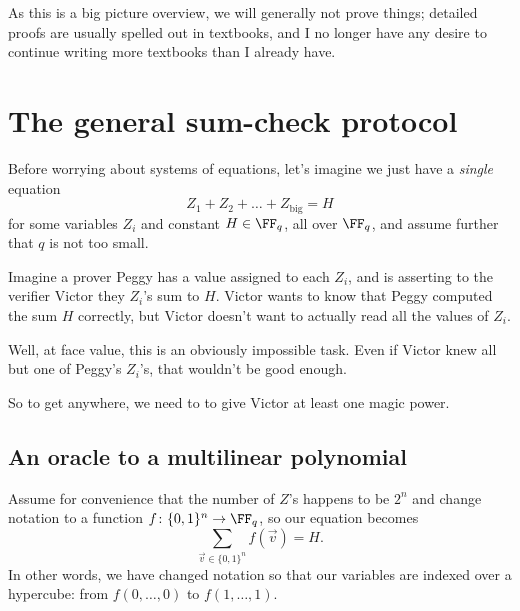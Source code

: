 \documentclass[11pt]{scrreprt}
\begin{document}
As this is a big picture overview, we will generally not prove things;
detailed proofs are usually spelled out in textbooks,
and I no longer have any desire to continue writing more textbooks than I already have.

\section{The general sum-check protocol}
Before worrying about systems of equations, let's imagine we just have a
\emph{single} equation
\[ Z_1 + Z_2 + \dots + Z_{\text{big}} = H \]
for some variables $Z_i$ and constant $H \in \FF_q$, all over $\FF_q$,
and assume further that $q$ is not too small.

Imagine a prover Peggy has a value assigned to each $Z_i$,
and is asserting to the verifier Victor they $Z_i$'s sum to $H$.
Victor wants to know that Peggy computed the sum $H$ correctly,
but Victor doesn't want to actually read all the values of $Z_i$.

Well, at face value, this is an obviously impossible task.
Even if Victor knew all but one of Peggy's $Z_i$'s, that wouldn't be good enough.

So to get anywhere, we need to to give Victor at least one magic power.

\subsection{An oracle to a multilinear polynomial}
Assume for convenience that the number of $Z$'s happens to be $2^n$
and change notation to a function $f \colon \{0,1\}^n \to \FF_q$, so our equation becomes
\[ \sum_{\vec v \in \{0,1\}^n} f(\vec v) = H. \]
In other words, we have changed notation so that our variables are indexed over a
hypercube: from $f(0, \dots, 0)$ to $f(1, \dots, 1)$.
\end{document}
